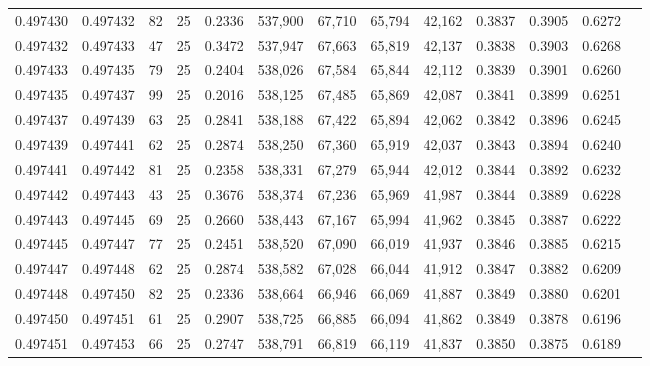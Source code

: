 \begin{tabular}{rrrrrrrrrrrrr}
0.497430 & 0.497432 &    82 &  25 &                                     0.2336 & 537,900 &  67,710 &  65,794 &  42,162 & 0.3837 & 0.3905 & 0.6272 \\
0.497432 & 0.497433 &    47 &  25 &                                     0.3472 & 537,947 &  67,663 &  65,819 &  42,137 & 0.3838 & 0.3903 & 0.6268 \\
0.497433 & 0.497435 &    79 &  25 &                                     0.2404 & 538,026 &  67,584 &  65,844 &  42,112 & 0.3839 & 0.3901 & 0.6260 \\
0.497435 & 0.497437 &    99 &  25 &                                     0.2016 & 538,125 &  67,485 &  65,869 &  42,087 & 0.3841 & 0.3899 & 0.6251 \\
0.497437 & 0.497439 &    63 &  25 &                                     0.2841 & 538,188 &  67,422 &  65,894 &  42,062 & 0.3842 & 0.3896 & 0.6245 \\
0.497439 & 0.497441 &    62 &  25 &                                     0.2874 & 538,250 &  67,360 &  65,919 &  42,037 & 0.3843 & 0.3894 & 0.6240 \\
0.497441 & 0.497442 &    81 &  25 &                                     0.2358 & 538,331 &  67,279 &  65,944 &  42,012 & 0.3844 & 0.3892 & 0.6232 \\
0.497442 & 0.497443 &    43 &  25 &                                     0.3676 & 538,374 &  67,236 &  65,969 &  41,987 & 0.3844 & 0.3889 & 0.6228 \\
0.497443 & 0.497445 &    69 &  25 &                                     0.2660 & 538,443 &  67,167 &  65,994 &  41,962 & 0.3845 & 0.3887 & 0.6222 \\
0.497445 & 0.497447 &    77 &  25 &                                     0.2451 & 538,520 &  67,090 &  66,019 &  41,937 & 0.3846 & 0.3885 & 0.6215 \\
0.497447 & 0.497448 &    62 &  25 &                                     0.2874 & 538,582 &  67,028 &  66,044 &  41,912 & 0.3847 & 0.3882 & 0.6209 \\
0.497448 & 0.497450 &    82 &  25 &                                     0.2336 & 538,664 &  66,946 &  66,069 &  41,887 & 0.3849 & 0.3880 & 0.6201 \\
0.497450 & 0.497451 &    61 &  25 &                                     0.2907 & 538,725 &  66,885 &  66,094 &  41,862 & 0.3849 & 0.3878 & 0.6196 \\
0.497451 & 0.497453 &    66 &  25 &                                     0.2747 & 538,791 &  66,819 &  66,119 &  41,837 & 0.3850 & 0.3875 & 0.6189 \\

\end{tabular}
